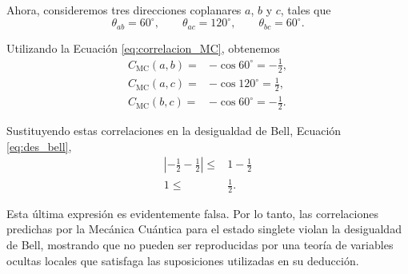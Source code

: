 Ahora, consideremos tres direcciones coplanares $a$, $b$ y $c$, tales que
$$ \theta_{ab}=60^\circ,\qquad \theta_{ac}=120^\circ,\qquad \theta_{bc}=60^\circ. $$

Utilizando la Ecuación \ref{eq:correlacion_MC}, obtenemos
\begin{align*}
	C_{\text{MC}}(a,b)=&-\cos60^\circ=-\frac{1}{2},
	\\
	C_{\text{MC}}(a,c)=&-\cos120^\circ=\frac{1}{2},
	\\
	C_{\text{MC}}(b,c)=&-\cos60^\circ=-\frac{1}{2}.
\end{align*}

Sustituyendo estas correlaciones en la desigualdad de Bell, Ecuación \ref{eq:des_bell},
\begin{align*}
	\left|-\frac{1}{2}-\frac{1}{2}\right|\leq&1-\frac{1}{2}
	\\
	1\leq&\frac{1}{2}.
\end{align*}

Esta última expresión es evidentemente falsa. Por lo tanto, las correlaciones predichas por la Mecánica Cuántica para el estado singlete violan la desigualdad de Bell, mostrando que no pueden ser reproducidas por una teoría de variables ocultas locales que satisfaga las suposiciones utilizadas en su deducción.
